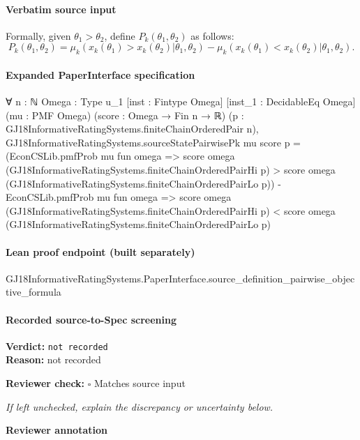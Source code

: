 \documentclass[10pt]{article}
\newcommand{\reviewerbox}{%
  \par\noindent\fbox{\parbox{0.96\linewidth}{\rule{0pt}{0.38in}}}\par
}
\newcommand{\reviewmatch}[1]{%
  \par\noindent\textbf{Reviewer check:} $\square$\; #1\par
  \noindent\emph{If left unchecked, explain the discrepancy or uncertainty below.}\par
}
\begin{document}
\paragraph{Verbatim source input}
\begin{ReviewVerbatim}
Formally, given $\theta_1 > \theta_2$, define $P_k(\theta_1, \theta_2)$ as follows:
\begin{equation}
\label{eq:Pk}
P_k(\theta_1, \theta_2) = \mu_k(x_k(\theta_1) > x_k(\theta_2)|\theta_1, \theta_2) - \mu_k(x_k(\theta_1) < x_k(\theta_2)|\theta_1, \theta_2).
\end{equation}
\end{ReviewVerbatim}


\paragraph{Expanded PaperInterface specification}
\begin{ReviewVerbatim}
∀ {n : ℕ} {Omega : Type u_1} [inst : Fintype Omega] [inst_1 : DecidableEq Omega] (mu : PMF Omega)
  (score : Omega → Fin n → ℝ) (p : GJ18InformativeRatingSystems.finiteChainOrderedPair n),
  GJ18InformativeRatingSystems.sourceStatePairwisePk mu score p =
    (EconCSLib.pmfProb mu fun omega =>
        score omega (GJ18InformativeRatingSystems.finiteChainOrderedPairHi p) >
          score omega (GJ18InformativeRatingSystems.finiteChainOrderedPairLo p)) -
      EconCSLib.pmfProb mu fun omega =>
        score omega (GJ18InformativeRatingSystems.finiteChainOrderedPairHi p) <
          score omega (GJ18InformativeRatingSystems.finiteChainOrderedPairLo p)
\end{ReviewVerbatim}

\paragraph{Lean proof endpoint (built separately)}\begin{ReviewVerbatim}
GJ18InformativeRatingSystems.PaperInterface.source_definition_pairwise_objective_formula
\end{ReviewVerbatim}

\paragraph{Recorded source-to-Spec screening}
\textbf{Verdict:} \texttt{not recorded}
\\
\textbf{Reason:} not recorded
\reviewmatch{Matches source input}
\noindent\textbf{Reviewer annotation}\par
\reviewerbox
\clearpage
\hypertarget{source-claim-bfe70859810ece12}{}
\end{document}
